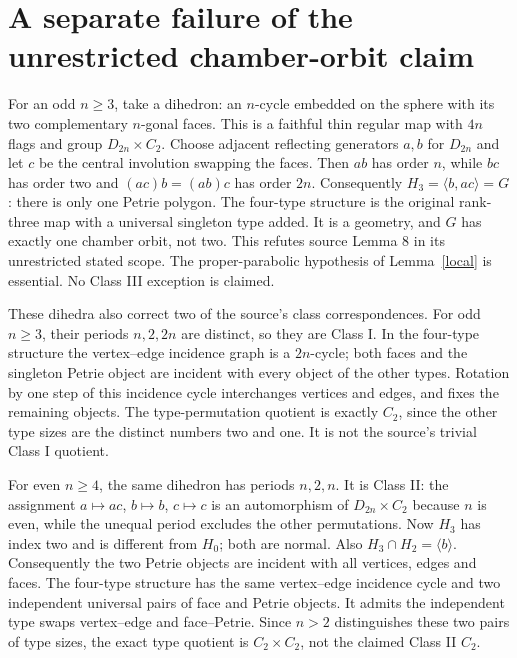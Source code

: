 \documentclass[11pt,a4paper]{article}
\newcommand{\gen}[1]{\langle#1\rangle}\newcommand{\F}{\mathbb F}\newcommand{\Aut}{\operatorname{Aut}}
\begin{document}
\section{A separate failure of the unrestricted chamber-orbit claim}

For an odd $n\geq3$, take a dihedron: an $n$-cycle embedded on the
sphere with its two complementary $n$-gonal faces. This is a faithful
thin regular map with $4n$ flags and group $D_{2n}\times C_2$.
Choose adjacent reflecting generators $a,b$ for $D_{2n}$ and let
$c$ be the central involution swapping the faces. Then $ab$ has
order $n$, while $bc$ has order two and $(ac)b=(ab)c$ has order
$2n$. Consequently $H_3=\gen{b,ac}=G$: there is only one Petrie
polygon. The four-type structure is the original rank-three map
with a universal singleton type added. It is a geometry, and $G$
has exactly one chamber orbit, not two. This refutes source Lemma 8
in its unrestricted stated scope. The proper-parabolic hypothesis
of Lemma~\ref{local} is essential. No Class III exception is claimed.

These dihedra also correct two of the source's class correspondences.
For odd $n\geq3$, their periods $n,2,2n$ are distinct, so they are
Class I. In the four-type structure the vertex--edge incidence graph
is a $2n$-cycle; both faces and the singleton Petrie object are
incident with every object of the other types. Rotation by one step
of this incidence cycle interchanges vertices and edges, and fixes
the remaining objects. The type-permutation quotient is exactly
$C_2$, since the other type sizes are the distinct numbers two and
one. It is not the source's trivial Class I quotient.

For even $n\geq4$, the same dihedron has periods $n,2,n$. It is
Class II: the assignment $a\mapsto ac$, $b\mapsto b$, $c\mapsto c$
is an automorphism of $D_{2n}\times C_2$ because $n$ is even, while
the unequal period excludes the other permutations. Now $H_3$ has
index two and is different from $H_0$; both are normal. Also
$H_3\cap H_2=\gen b$. Consequently the two Petrie objects are
incident with all vertices, edges and faces. The four-type structure
has the same vertex--edge incidence cycle and two independent
universal pairs of face and Petrie objects. It admits the independent
type swaps vertex--edge and face--Petrie. Since $n>2$ distinguishes
these two pairs of type sizes, the exact type quotient is
$C_2\times C_2$, not the claimed Class II $C_2$.
\end{document}
